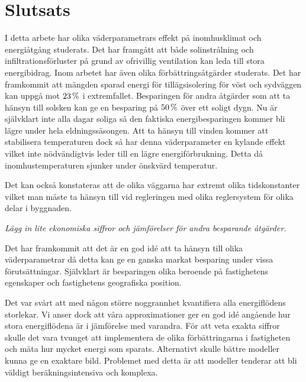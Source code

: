 \chapter{Slutsats}


I detta arbete har olika väderparametrars effekt på inomhusklimat och energiåtgång studerats.
Det har framgått att både solinstrålning och infiltrationsförluster på grund av ofrivillig
ventilation kan leda till stora energibidrag. Inom arbetet har även olika förbättringsåtgärder
studerats. Det har framkommit att mängden sparad energi för tillägsisolering för vöst och sydväggen
kan uppgå mot $\unit[23]{\%}$ i extremfallet. Besparingen för andra åtgärder som att ta hänsyn till solsken
kan ge en besparing på $\unit[50]{\%}$ över ett soligt dygn.  Nu är självklart inte alla dagar soliga
så den faktiska energibesparingen kommer bli lägre under hela eldningssäsongen.
Att ta hänsyn till vinden kommer att stabilisera
temperaturen dock så har denna väderparameter en kylande effekt vilket inte nödvändigtvis leder
till en lägre energiförbrukning. Detta då inomhustemperaturen sjunker under önskvärd temperatur. 

Det kan också konstateras att de olika väggarna har extremt olika tidskonstanter vilket man måste ta hänsyn till vid regleringen med olika reglersystem för olika delar i byggnaden.

\emph{\color{red} Lägg in lite ekonomiska siffror och jämförelser för andra besparande åtgärder.}

Det har framkommit att det är en god idé att ta hänsyn till olika väderparametrar då
detta kan ge en ganska markat besparing under vissa förutsättningar. Självklart är
besparingen olika beroende på fastighetens egenskaper och fastighetens geografiska position.

Det var svårt att med någon större noggrannhet kvantifiera alla energiflödens storlekar. Vi
anser dock att våra approximationer ger en god idé angående hur stora energiflödena är i jämförelse
med varandra. För att veta exakta siffror skulle det vara tvunget att implementera de olika
förbättringarna i fastigheten och mäta hur mycket energi som sparats. Alternativt skulle
bättre modeller kunna ge en exaktare bild. Problemet med detta är att modeller tenderar att
bli väldigt beräkningsintensiva och komplexa.

